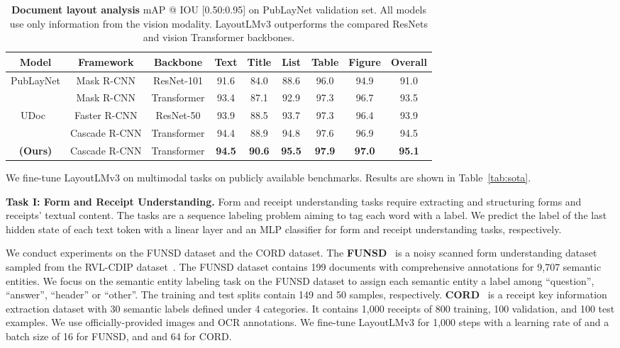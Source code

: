 \documentclass[sigconf]{acmart}
\begin{document}
\begin{table*}[t]
    \centering
\caption{\textbf{Document layout analysis} mAP @ IOU [0.50:0.95] on PubLayNet validation set. All models use only information from the vision modality.
    LayoutLMv3 outperforms the compared ResNets \protect\cite{zhong2019publaynet, gu2021unidoc} and vision Transformer \protect\cite{li2022dit} backbones.
    }
    \label{tab:publaynet}
    \begin{tabular}{ccccccccc}
        \toprule
        \multicolumn{1}{c}{\bf Model} & \bf Framework & \bf Backbone & \bf Text & \bf Title & \bf List & \bf Table & \bf Figure & \bf Overall \\
        \midrule
        PubLayNet\cite{zhong2019publaynet} & Mask R-CNN & ResNet-101 & 91.6 & 84.0 & 88.6 & 96.0 & 94.9 & 91.0\\
        ~\cite{li2022dit} & Mask R-CNN & Transformer & 93.4 & 87.1 & 92.9 & 97.3 & 96.7 & 93.5\\
        UDoc~\cite{gu2021unidoc} & Faster R-CNN & ResNet-50 & 93.9 & 88.5 & 93.7 & 97.3 & 96.4 & 93.9 \\
        ~\cite{li2022dit} & Cascade R-CNN & Transformer & 94.4 & 88.9 & 94.8 & 97.6 & 96.9 & 94.5\\
        \midrule
        \bf  (Ours) & Cascade R-CNN & Transformer & \bf 94.5 & \bf 90.6 & \bf 95.5 & \bf 97.9 & \bf 97.0 & \bf 95.1 \\
        \bottomrule
    \end{tabular}
\end{table*}


We fine-tune LayoutLMv3 on multimodal tasks on publicly available benchmarks.
Results are shown in Table~\ref{tab:sota}.

\noindent \textbf{Task I: Form and Receipt Understanding.}
Form and receipt understanding tasks require extracting and structuring forms and receipts' textual content.
The tasks are a sequence labeling problem aiming to tag each word with a label.
We predict the label of the last hidden state of each text token with a linear layer and an MLP classifier for form and receipt understanding tasks, respectively. 

We conduct experiments on the FUNSD dataset and the CORD dataset.
The \textbf{FUNSD}~\cite{jaume2019funsd} is a noisy scanned form understanding dataset sampled from the RVL-CDIP dataset~\cite{harley2015icdar}.
The FUNSD dataset contains 199 documents with comprehensive annotations for 9,707 semantic entities. We focus on the semantic entity labeling task on the FUNSD dataset to assign each semantic entity a label among ``question'', ``answer'', ``header'' or ``other''.
The training and test splits contain 149 and 50 samples, respectively.
\textbf{CORD}~\cite{park2019cord} is a receipt key information extraction dataset with 30 semantic labels defined under 4 categories.
It contains 1,000 receipts of 800 training, 100 validation, and 100 test examples. 
We use officially-provided images and OCR annotations.
We fine-tune LayoutLMv3 for 1,000 steps with a learning rate of  and a batch size of 16 for FUNSD, and  and 64 for CORD.
\end{document}

